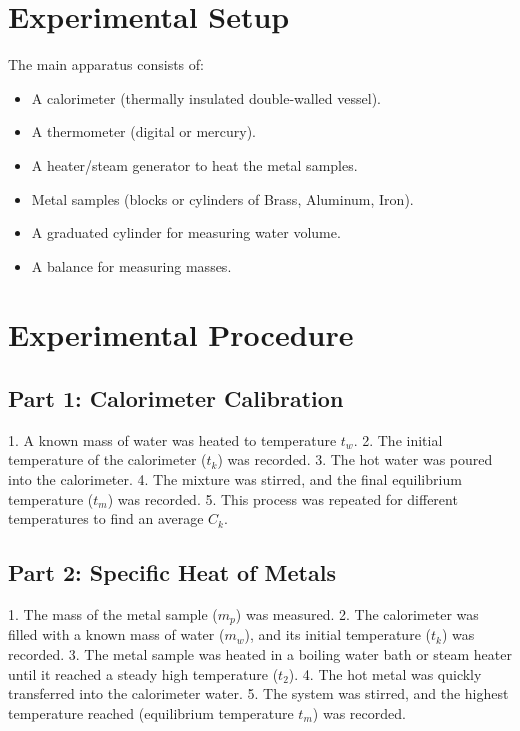 \documentclass[journal]{IEEEtran}
\begin{document}
\section{Experimental Setup}
The main apparatus consists of:
\begin{itemize}
    \item A calorimeter (thermally insulated double-walled vessel).
    \item A thermometer (digital or mercury).
    \item A heater/steam generator to heat the metal samples.
    \item Metal samples (blocks or cylinders of Brass, Aluminum, Iron).
    \item A graduated cylinder for measuring water volume.
    \item A balance for measuring masses.
\end{itemize}

\section{Experimental Procedure}

\subsection{Part 1: Calorimeter Calibration}
1.  A known mass of water was heated to temperature $t_w$.
2.  The initial temperature of the calorimeter ($t_k$) was recorded.
3.  The hot water was poured into the calorimeter.
4.  The mixture was stirred, and the final equilibrium temperature ($t_m$) was recorded.
5.  This process was repeated for different temperatures to find an average $C_k$.

\subsection{Part 2: Specific Heat of Metals}
1.  The mass of the metal sample ($m_p$) was measured.
2.  The calorimeter was filled with a known mass of water ($m_w$), and its initial temperature ($t_k$) was recorded.
3.  The metal sample was heated in a boiling water bath or steam heater until it reached a steady high temperature ($t_2$).
4.  The hot metal was quickly transferred into the calorimeter water.
5.  The system was stirred, and the highest temperature reached (equilibrium temperature $t_m$) was recorded.
\end{document}
